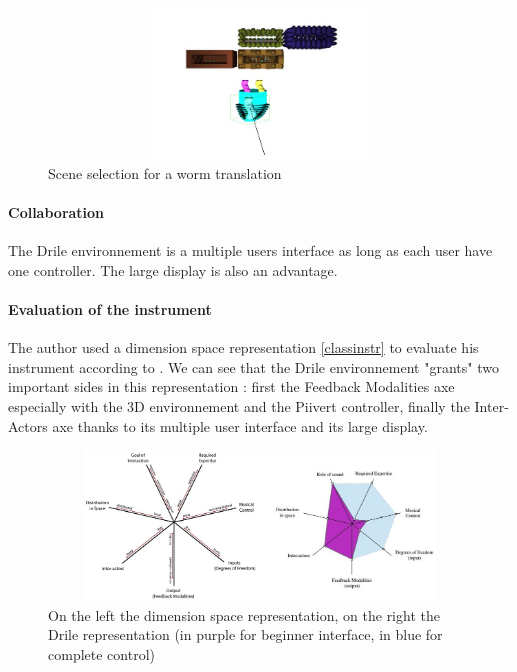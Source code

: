 \begin{figure}[h!]
\centering\includegraphics[width=14cm,height=4cm]{image/scenes.JPG}
\caption{Scene selection for a worm translation}
\label{fig:scene}
\end{figure} 

\paragraph{Collaboration}

The Drile environnement is a multiple users interface as long as each user have one controller. The large display is also an advantage.

\paragraph{Evaluation of the instrument}

The author used a dimension space representation \ref{classinstr} to evaluate his instrument according to \cite{birnbaum2005towards}. We can see that the Drile environnement "grants" two important sides in this representation : first the Feedback Modalities axe especially with the 3D environnement and the Piivert controller, finally the Inter-Actors axe thanks to its multiple user interface and its large display.

\begin{figure}[h!]
\centering\includegraphics[width=14cm,height=4cm]{image/classification_new_instr.jpg}
\caption{On the left the dimension space representation,
on the right the Drile representation (in purple for beginner interface, in blue for complete control)}
\label{fig:classinstr}
\end{figure} 


